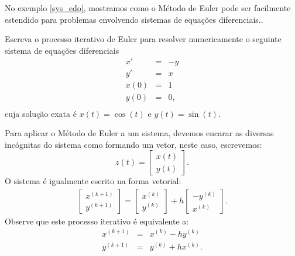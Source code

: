No exemplo \ref{sys_edo}, mostramos como o Método de Euler pode ser facilmente estendido para problemas envolvendo sistemas de equações diferenciais..
\begin{ex}\label{sys_edo} Escreva o processo iterativo de Euler para resolver numericamente o seguinte sistema de equações diferenciais
\begin{eqnarray*}
x'&=&-y\\
y'&=&x\\
x(0)&=&1\\
y(0)&=&0,\\
\end{eqnarray*}
cuja solução exata é $x(t)=\cos(t)$ e $y(t)=\sin(t)$.
\end{ex}
Para aplicar o Método de Euler a um sistema, devemos encarar as diversas incógnitas do sistema como formando um vetor, neste caso, escrevemos: 
 $$z(t)=\left[\begin{array}{c}x(t)\\y(t)\end{array}\right].$$
 O sistema é igualmente escrito na forma vetorial:
\begin{eqnarray*}
\left[\begin{array}{c}x^{(k+1)}\\y^{(k+1)}\end{array}\right]=\left[\begin{array}{c}x^{(k)}\\y^{(k)}\end{array}\right]+h\left[\begin{array}{c}-y^{(k)}\\x^{(k)}\end{array}\right].
\end{eqnarray*}
Observe que este processo iterativo é equivalente a:
\begin{eqnarray*}
x^{(k+1)}&=&x^{(k)}-hy^{(k)}\\
y^{(k+1)}&=&y^{(k)}+hx^{(k)}.
\end{eqnarray*}

